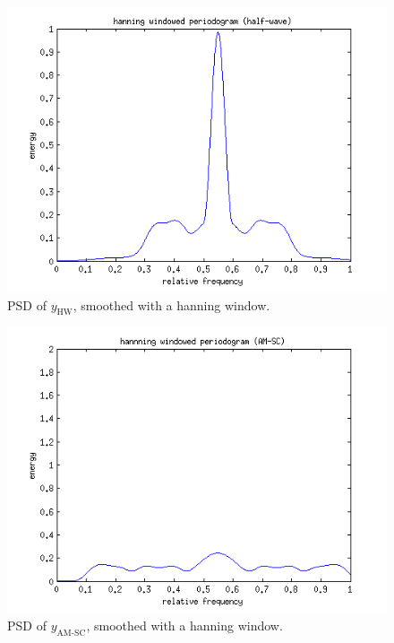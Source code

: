 \documentclass[10pt]{article}
\begin{document}
\begin{figure}[!hp]
    \begin{center}
      \includegraphics[width=1\textwidth]{ideal_periodogram_hanning_half-wave}
    \caption{PSD of $y_\text{HW}$, smoothed with a hanning window. \label{fig:TheoACFsimple}}
    \end{center}
\end{figure}

\begin{figure}[!hp]
    \begin{center}
      \includegraphics[width=1\textwidth]{ideal_periodogram_hanning_AM-SC}
    \caption{PSD of $y_\text{AM-SC}$, smoothed with a hanning window. \label{fig:TheoACFsimple}}
    \end{center}
\end{figure}
\end{document}
